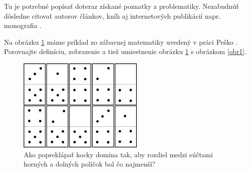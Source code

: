 Tu je potrebné popísať doteraz získané poznatky z problematiky.
Nezabudnúť dôsledne citovať autorov článkov, kníh aj internetových publikácií
napr. monografia \cite{pes2, berman}.

Na obrázku \ref{obr1a} máme príklad zo zábavnej matematiky uvedený v práci Peško \cite{pes2}.
Porovnajte definíciu, zobrazenie a tiež umiestnenie obrázku \ref{obr1a} s obrázkom \ref{obr1}.

\begin{figure}[ht]
\begin{center}
\includegraphics[width=.5\textwidth]{domino.jpg}
\caption{Ako popreklápať kocky domina tak, aby rozdiel medzi
súčtami horných a dolných políčok bol čo najmenší? }
\label{obr1a}
\end{center}
\end{figure}
